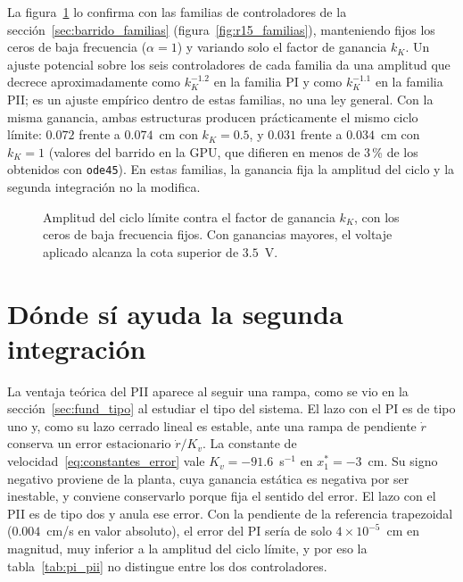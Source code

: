 La figura~\ref{fig:ganancia} lo confirma con las familias de controladores de la sección~\ref{sec:barrido_familias} (figura~\ref{fig:r15_familias}), manteniendo fijos los ceros de baja frecuencia ($\alpha=1$) y variando solo el factor de ganancia $k_K$. Un ajuste potencial sobre los seis controladores de cada familia da una amplitud que decrece aproximadamente como $k_K^{-1.2}$ en la familia PI y como $k_K^{-1.1}$ en la familia PII; es un ajuste empírico dentro de estas familias, no una ley general. Con la misma ganancia, ambas estructuras producen prácticamente el mismo ciclo límite: $0.072$ frente a $0.074$~cm con $k_K=0.5$, y $0.031$ frente a $0.034$~cm con $k_K=1$ (valores del barrido en la GPU, que difieren en menos de 3\,\% de los obtenidos con \texttt{ode45}). En estas familias, la ganancia fija la amplitud del ciclo y la segunda integración no la modifica.

\begin{figure}[ht]
    \centering
    
    \caption[Ciclo límite contra la ganancia]{Amplitud del ciclo límite contra el factor de ganancia $k_K$, con los ceros de baja frecuencia fijos. Con ganancias mayores, el voltaje aplicado alcanza la cota superior de $3.5$~V.}
    \label{fig:ganancia}
\end{figure}

\section{Dónde sí ayuda la segunda integración}\label{sec:ventaja_rampa}

La ventaja teórica del PII aparece al seguir una rampa, como se vio en la sección~\ref{sec:fund_tipo} al estudiar el tipo del sistema. El lazo con el PI es de tipo uno y, como su lazo cerrado lineal es estable, ante una rampa de pendiente $\dot r$ conserva un error estacionario $\dot r/K_v$. La constante de velocidad~\eqref{eq:constantes_error} vale $K_v=-91.6$~s$^{-1}$ en $x_1^*=-3$~cm. Su signo negativo proviene de la planta, cuya ganancia estática es negativa por ser inestable, y conviene conservarlo porque fija el sentido del error. El lazo con el PII es de tipo dos y anula ese error. Con la pendiente de la referencia trapezoidal ($0.004$~cm/s en valor absoluto), el error del PI sería de solo $4\times10^{-5}$~cm en magnitud, muy inferior a la amplitud del ciclo límite, y por eso la tabla~\ref{tab:pi_pii} no distingue entre los dos controladores.

